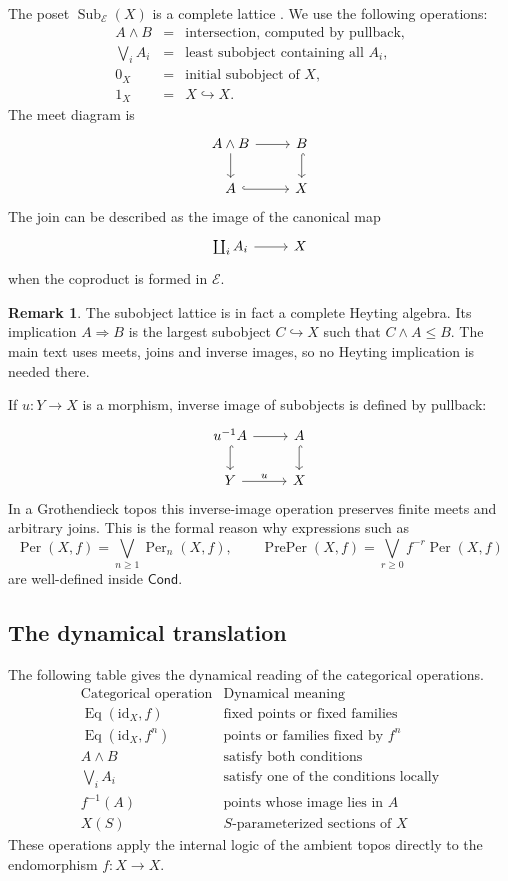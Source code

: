\documentclass[10pt]{amsart}
\newcommand{\Cond}{\mathsf{Cond}}
\newcommand{\Sub}{\operatorname{Sub}}
\newcommand{\Eq}{\operatorname{Eq}}
\newcommand{\Per}{\operatorname{Per}}
\newcommand{\PrePer}{\operatorname{PrePer}}
\theoremstyle{plain}
\theoremstyle{definition}
\newtheorem{remark}[theorem]{Remark}
\begin{document}
The poset $\Sub_{\mathcal E}(X)$ is a complete lattice
\cite{MacLaneMoerdijk,JohnstoneTopos}. We use the following operations:
\[
\begin{array}{ccl}
A\wedge B & = & \text{intersection, computed by pullback},\\[2mm]
\displaystyle\bigvee_i A_i & = & \text{least subobject containing all }A_i,\\[2mm]
0_X & = & \text{initial subobject of }X,\\[1mm]
1_X & = & X\hookrightarrow X.
\end{array}
\]
The meet diagram is
\[
\begin{tikzcd}
A\wedge B \arrow[r] \arrow[d] & B \arrow[d, hook]\\
A \arrow[r, hook] & X
\end{tikzcd}
\]
The join can be described as the image of the canonical map
\[
\begin{tikzcd}
\coprod_i A_i \arrow[r] & X
\end{tikzcd}
\]
when the coproduct is formed in $\mathcal E$.

\begin{remark}
The subobject lattice is in fact a complete Heyting algebra. Its implication
$A\Rightarrow B$ is the largest subobject $C\hookrightarrow X$ such that
$C\wedge A\le B$. The main text uses meets, joins and inverse images, so no
Heyting implication is needed there.
\end{remark}

If $u:Y\to X$ is a morphism, inverse image of subobjects is defined by
pullback:
\[
\begin{tikzcd}
u^{-1}A \arrow[r] \arrow[d, hook] & A \arrow[d, hook]\\
Y \arrow[r, "u"] & X
\end{tikzcd}
\]
In a Grothendieck topos this inverse-image operation preserves finite meets
and arbitrary joins. This is the formal reason why expressions such as
\[
  \Per(X,f)=\bigvee_{n\ge1}\Per_n(X,f),
  \qquad
  \PrePer(X,f)=\bigvee_{r\ge0}f^{-r}\Per(X,f)
\]
are well-defined inside $\Cond$.

\subsection{The dynamical translation}

The following table gives the dynamical reading of the categorical operations.
\[
\begin{array}{c|c}
\text{Categorical operation} & \text{Dynamical meaning}\\
\hline
\Eq(\mathrm{id}_X,f) & \text{fixed points or fixed families}\\
\Eq(\mathrm{id}_X,f^n) & \text{points or families fixed by }f^n\\
A\wedge B & \text{satisfy both conditions}\\
\bigvee_i A_i & \text{satisfy one of the conditions locally}\\
f^{-1}(A) & \text{points whose image lies in }A\\
X(S) & S\text{-parameterized sections of }X
\end{array}
\]
These operations apply the internal logic of the ambient topos directly to the
endomorphism $f:X\to X$.
\end{document}

